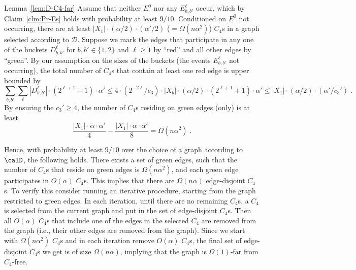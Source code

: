 \medskip
\begin{proofof}{Lemma~\ref{lem:D-C4-far}}
Assume that neither $E^0$ nor any $E_{b,b'}^\ell$ occur, which by Claim~\ref{clm:Pr-Es} holds with probability at least  $9/10$. Conditioned on $E^0$ not occurring, there are at least  $|X_1|\cdot (\alpha/2)\cdot (\alpha'/2)$ ($ = \Omega(n\alpha^2)$) $C_4$s in a graph selected according to $\mathcal{D}$.
Suppose we mark the edges that participate in any one of the buckets $D_{b,b'}^\ell$ for $b,b'\in \{1,2\}$ and $\ell\geq 1$ by ``red'' and all other edges by ``green''.
By our assumption on the sizes of the buckets (the events $E_{b,b'}^\ell$ not occurring), the total number of $C_4$s that contain at least one red edge is upper bounded by
\begin{equation}
\sum_{b,b'}\sum_\ell |D_{b,b'}^\ell|\cdot (2^{\ell+1}+1)\cdot \alpha' \leq
  4 \cdot (2^{-2\ell}/c_3)\cdot |X_b|\cdot (\alpha/2) \cdot (2^{\ell+1} +1)\cdot \alpha' \leq   |X_1|\cdot(\alpha/2)\cdot (\alpha'/c_3') %
  \;.
\end{equation}
By ensuring the $c_3' \geq 4$,
the number of $C_4$s residing  on green edges (only) is at least
\begin{equation}
\frac{|X_1|\cdot\alpha\cdot\alpha'}{4}
- \frac{|X_1|\cdot\alpha\cdot\alpha'}{8} =
\Omega(n \alpha^2)\;.
\end{equation}

Hence, with probability at least $9/10$ over the choice of a graph according to $\calD$, the following holds. There exists a set of green edges,  such that the number of $C_4$s that reside  on green edges is $\Omega(n\alpha^2)$, and each green edge participates in  $O(\alpha)$ $C_4$s. This implies that there are $\Omega(n\alpha)$ edge-disjoint $C_4$s. To verify this consider running an iterative procedure, starting from the graph restricted to green edges. In each iteration, until there are no remaining $C_4$s, a $C_4$ is selected from the current graph and put in the set of edge-disjoint $C_4$s. Then all $O(\alpha)$ $C_4$s that include one of the edges in the selected $C_4$ are removed from the graph (i.e., their other edges are removed from the graph). Since we start with $\Omega(n\alpha^2)$ $C_4$s and in each iteration remove $O(\alpha)$ $C_4$s, the final set of edge-disjoint $C_4$s we get is of size $\Omega(n\alpha)$, implying that the graph is $\Omega(1)$-far from $C_4$-free.
\end{proofof}

